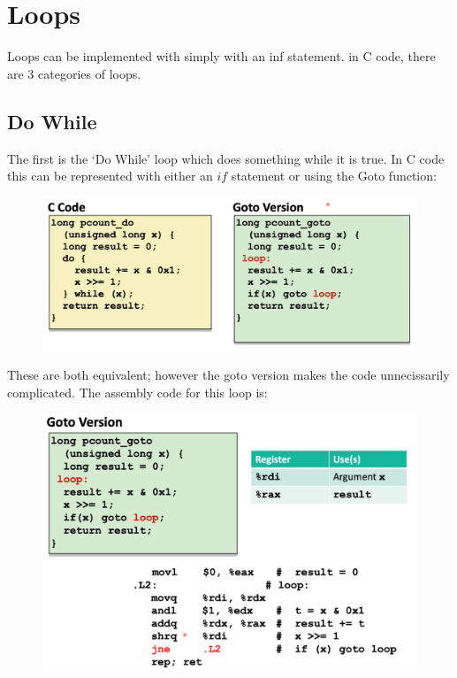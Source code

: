 \documentclass[12pt]{book}
\begin{document}
\section*{Loops}
Loops can be implemented with simply with an inf statement. in C code, there are 3 categories of loops. 
\subsection*{Do While}
The first is the 
`Do While' loop which does something while it is true. In C code this can be represented with either an $if$ statement or
using the Goto function:
\begin{figure}[h]
        \centering
        \includegraphics[scale = 0.4]{./figures/doWhile}
\end{figure}

These are both equivalent; however the goto version makes the code unnecissarily complicated. The assembly code for this
loop is:
\pagebreak


\begin{figure}[h]
        \centering
        \includegraphics[scale = 0.3]{./figures/doWhileAsmbly}
\end{figure}
\end{document}
